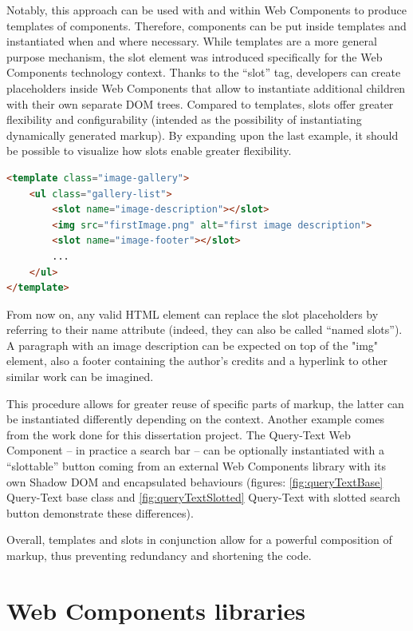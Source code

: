 Notably, this approach can be used with and within Web Components to produce templates of components. Therefore, components can be put inside templates and instantiated when and where necessary.
While templates are a more general purpose mechanism, the slot element was introduced specifically for the Web Components technology context.  Thanks to the “slot” tag, developers can create placeholders inside Web Components that allow to instantiate additional children with their own separate DOM trees. Compared to templates, slots offer greater flexibility and configurability (intended as the possibility of instantiating dynamically generated markup). By expanding upon the last example, it should be possible to visualize how slots enable greater flexibility.
\\
\begin{lstlisting}[caption={Slotted templates},label={slottedTemplate}, language=HTML]
<template class="image-gallery">
    <ul class="gallery-list">
        <slot name="image-description"></slot>
        <img src="firstImage.png" alt="first image description">
        <slot name="image-footer"></slot>
        ...
    </ul>
</template>
\end{lstlisting}

From now on, any valid HTML element can replace the slot placeholders by referring to their name attribute (indeed, they can also be called “named slots”). A paragraph with an image description can be expected on top of the "img" element, also a footer containing the author’s credits and a hyperlink to other similar work can be imagined.

This procedure allows for greater reuse of specific parts of markup, the latter can be instantiated differently depending on the context. Another example comes from the work done for this dissertation project. The Query-Text Web Component – in practice a search bar – can be optionally instantiated with a “slottable” button coming from an external Web Components library with its own Shadow DOM and encapsulated behaviours (figures: \ref{fig:queryTextBase} Query-Text base class and \ref{fig:queryTextSlotted} Query-Text with slotted search button demonstrate these differences).

Overall, templates and slots in conjunction allow for a powerful composition of markup, thus preventing redundancy and shortening the code. 

\section{Web Components libraries}
\label{sec:wCLibraries}


